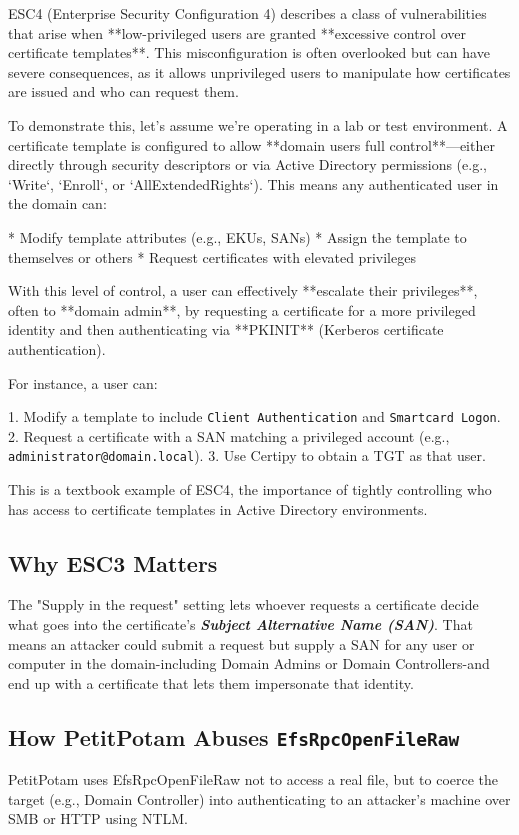 ESC4 (Enterprise Security Configuration 4) describes a class of vulnerabilities that arise when **low-privileged users are granted **excessive control over certificate templates**. This misconfiguration is often overlooked but can have severe consequences, as it allows unprivileged users to manipulate how certificates are issued and who can request them.

To demonstrate this, let’s assume we’re operating in a lab or test environment. A certificate template is configured to allow **domain users full control**—either directly through security descriptors or via Active Directory permissions (e.g., `Write`, `Enroll`, or `AllExtendedRights`). This means any authenticated user in the domain can:

* Modify template attributes (e.g., EKUs, SANs)
* Assign the template to themselves or others
* Request certificates with elevated privileges

With this level of control, a user can effectively **escalate their privileges**, often to **domain admin**, by requesting a certificate for a more privileged identity and then authenticating via **PKINIT** (Kerberos certificate authentication).

For instance, a user can:

1. Modify a template to include \texttt{Client Authentication} and \texttt{Smartcard Logon}.
2. Request a certificate with a SAN matching a privileged account (e.g., \texttt{administrator@domain.local}).
3. Use Certipy to obtain a TGT as that user.

This is a textbook example of ESC4,  the importance of tightly controlling who has access to certificate templates in Active Directory environments.


\subsection{Why ESC3 Matters}
The "Supply in the request" setting lets whoever requests a certificate decide what goes into the certificate's \textbf{\textit{Subject Alternative Name (SAN)}}. That means an attacker could submit a request but supply a SAN for any user or computer in the domain-including Domain Admins or Domain Controllers-and end up with a certificate that lets them impersonate that identity.
\subsection{How PetitPotam Abuses \texttt{EfsRpcOpenFileRaw}}
PetitPotam uses EfsRpcOpenFileRaw not to access a real file, but to coerce the target (e.g., Domain Controller) into authenticating to an attacker's machine over SMB or HTTP using NTLM.

